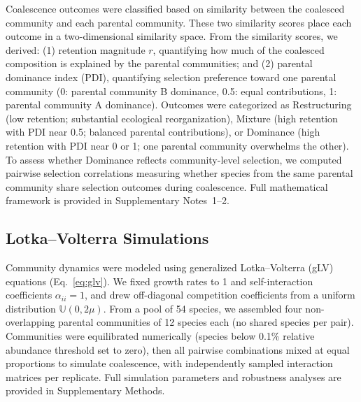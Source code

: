 Coalescence outcomes were classified based on similarity between the coalesced community and each parental community.  These two similarity scores place each outcome in a two-dimensional similarity space. From the similarity scores, we derived: (1) retention magnitude $r$, quantifying how much of the coalesced composition is explained by the parental communities; and (2) parental dominance index (PDI), quantifying selection preference toward one parental community (0: parental community B dominance, 0.5: equal contributions, 1: parental community A dominance).  Outcomes were categorized as Restructuring (low retention; substantial ecological reorganization), Mixture (high retention with PDI near 0.5; balanced parental contributions), or Dominance (high retention with PDI near 0 or 1; one parental community overwhelms the other). To assess whether Dominance reflects community-level selection, we computed pairwise selection correlations measuring whether species from the same parental community share selection outcomes during coalescence. Full mathematical framework is provided in Supplementary Notes~1--2.


\subsection*{Lotka--Volterra Simulations}
\label{sec:methods:simulations}

Community dynamics were modeled using generalized Lotka--Volterra (gLV) equations (Eq.~\ref{eq:glv}). We fixed growth rates to 1 and self-interaction coefficients $\alpha_{ii} = 1$, and drew off-diagonal competition coefficients from a uniform distribution $\mathbb{U}(0, 2\mu)$. From a pool of 54 species, we assembled four non-overlapping parental communities of 12 species each (no shared species per pair). Communities were equilibrated numerically (species below 0.1\% relative abundance threshold set to zero), then all pairwise combinations mixed at equal proportions to simulate coalescence, with independently sampled interaction matrices per replicate. Full simulation parameters and robustness analyses are provided in Supplementary Methods.


